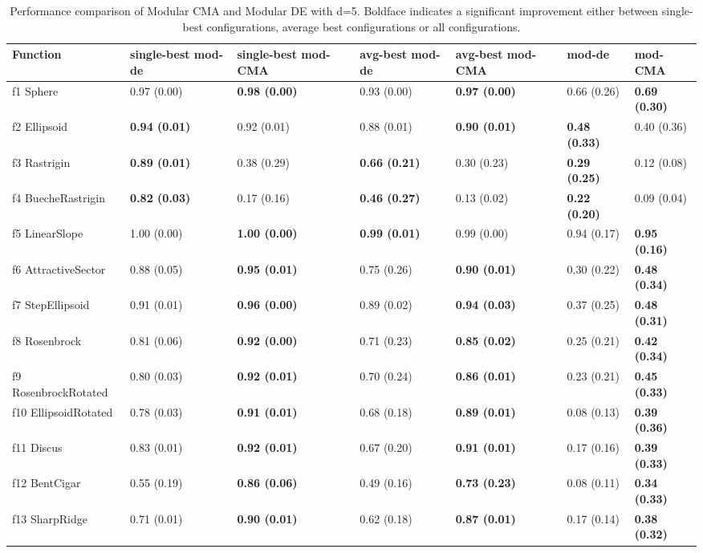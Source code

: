 \begin{table}
\caption{Performance comparison of Modular CMA and Modular DE with d=5. Boldface indicates a significant improvement either between single-best configurations, average best configurations or all configurations.}
\begin{tabular}{lllllll}
\toprule
Function & single-best mod-de & single-best mod-CMA & avg-best mod-de & avg-best mod-CMA & mod-de & mod-CMA \\
\midrule
f1 Sphere & 0.97 (0.00) & \textbf{0.98 (0.00)} & 0.93 (0.00) & \textbf{0.97 (0.00)} & 0.66 (0.26) & \textbf{0.69 (0.30)} \\
f2 Ellipsoid & \textbf{0.94 (0.01)} & 0.92 (0.01) & 0.88 (0.01) & \textbf{0.90 (0.01)} & \textbf{0.48 (0.33)} & 0.40 (0.36) \\
f3 Rastrigin & \textbf{0.89 (0.01)} & 0.38 (0.29) & \textbf{0.66 (0.21)} & 0.30 (0.23) & \textbf{0.29 (0.25)} & 0.12 (0.08) \\
f4 BuecheRastrigin & \textbf{0.82 (0.03)} & 0.17 (0.16) & \textbf{0.46 (0.27)} & 0.13 (0.02) & \textbf{0.22 (0.20)} & 0.09 (0.04) \\
f5 LinearSlope & 1.00 (0.00) & \textbf{1.00 (0.00)} & \textbf{0.99 (0.01)} & 0.99 (0.00) & 0.94 (0.17) & \textbf{0.95 (0.16)} \\
f6 AttractiveSector & 0.88 (0.05) & \textbf{0.95 (0.01)} & 0.75 (0.26) & \textbf{0.90 (0.01)} & 0.30 (0.22) & \textbf{0.48 (0.34)} \\
f7 StepEllipsoid & 0.91 (0.01) & \textbf{0.96 (0.00)} & 0.89 (0.02) & \textbf{0.94 (0.03)} & 0.37 (0.25) & \textbf{0.48 (0.31)} \\
f8 Rosenbrock & 0.81 (0.06) & \textbf{0.92 (0.00)} & 0.71 (0.23) & \textbf{0.85 (0.02)} & 0.25 (0.21) & \textbf{0.42 (0.34)} \\
f9 RosenbrockRotated & 0.80 (0.03) & \textbf{0.92 (0.01)} & 0.70 (0.24) & \textbf{0.86 (0.01)} & 0.23 (0.21) & \textbf{0.45 (0.33)} \\
f10 EllipsoidRotated & 0.78 (0.03) & \textbf{0.91 (0.01)} & 0.68 (0.18) & \textbf{0.89 (0.01)} & 0.08 (0.13) & \textbf{0.39 (0.36)} \\
f11 Discus & 0.83 (0.01) & \textbf{0.92 (0.01)} & 0.67 (0.20) & \textbf{0.91 (0.01)} & 0.17 (0.16) & \textbf{0.39 (0.33)} \\
f12 BentCigar & 0.55 (0.19) & \textbf{0.86 (0.06)} & 0.49 (0.16) & \textbf{0.73 (0.23)} & 0.08 (0.11) & \textbf{0.34 (0.33)} \\
f13 SharpRidge & 0.71 (0.01) & \textbf{0.90 (0.01)} & 0.62 (0.18) & \textbf{0.87 (0.01)} & 0.17 (0.14) & \textbf{0.38 (0.32)} \\

\end{tabular}
\end{table}
